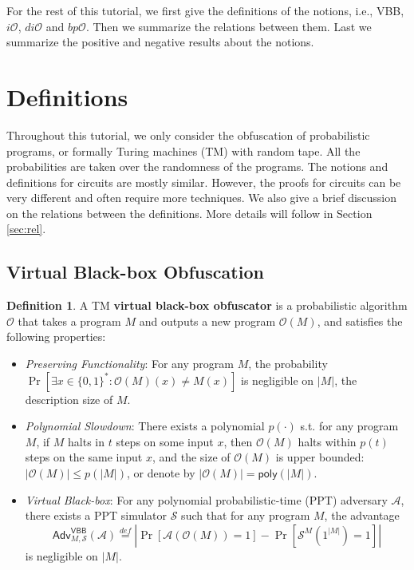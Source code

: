 \documentclass[12pt]{article}
\newcommand{\eqdef}{\stackrel{def}{=}}
\newcommand{\bits}{\{0,1\}}
\newcommand{\A}{\mathcal{A}}
\newcommand{\Sim}{\mathcal{S}}
\newcommand{\Adv}{\mathsf{Adv}}
\newcommand{\poly}{\mathsf{poly}}
\newcommand{\io}{i\mathcal{O}}
\newcommand{\dio}{di\mathcal{O}}
\newcommand{\bpo}{bp\mathcal{O}}
\theoremstyle{definition}
\newtheorem{definition}[theorem]{Definition}
\begin{document}
For the rest of this tutorial, we first give the definitions of the notions, i.e., VBB, $\io$, $\dio$ and $\bpo$. Then we summarize the relations between them. Last we summarize the positive and negative results about the notions.

\newcommand{\bigoh}{\mathcal{O}}
\newcommand{\M}{\mathcal{M}}
\newcommand{\VBB}{\mathsf{VBB}}
\section{Definitions}
Throughout this tutorial, we only consider the obfuscation of probabilistic programs, or formally Turing machines (TM) with random tape. All the probabilities are taken over the randomness of the programs. The notions and definitions for circuits are mostly similar. However, the proofs for circuits can be very different and often require more techniques. We also give a brief discussion on the relations between the definitions. More details will follow in Section \ref{sec:rel}.
\subsection{Virtual Black-box Obfuscation}
\begin{definition}
\label{def:vbb}
A TM {\bf virtual black-box obfuscator} is a probabilistic algorithm $\bigoh$ that takes a program $M$ and outputs a new program $\bigoh(M)$, and satisfies the following properties:
\begin{itemize}
\item \emph{Preserving Functionality}: For any program $M$, the probability
$\Pr[\exists x \in \bits^* : \bigoh(M)(x) \not= M(x)]$
is negligible on $|M|$, the description size of $M$.
\item \emph{Polynomial Slowdown}: There exists a polynomial $p(\cdot)$ s.t. for any program $M$, if $M$ halts in $t$ steps on some input $x$, then $\bigoh(M)$ halts within $p(t)$ steps on the same input $x$, and the size of $\bigoh(M)$ is upper bounded: $|\bigoh(M)| \leq p(|M|)$, or denote by $|\bigoh(M)| = \poly(|M|)$.
\item \emph{Virtual Black-box}: For any polynomial probabilistic-time (PPT) adversary $\A$, there exists a PPT simulator $\Sim$ such that for any program $M$, the advantage 
$$\Adv_{M,\Sim}^{\VBB}(\A) \eqdef \left| \Pr[\A(\bigoh(M)) = 1] - \Pr[\Sim^{M}(1^{|M|}) = 1] \right|$$
is negligible on $|M|$.
\end{itemize}
\end{definition}
\end{document}
